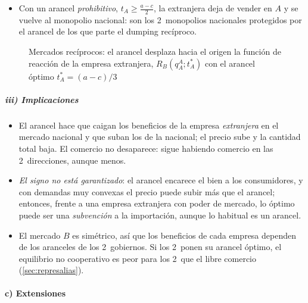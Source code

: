 \documentclass[11pt]{article}
\begin{document}
\begin{itemize}
  \begin{equation}\label{eq:arancel-estrategico}
  t_A^*=\frac{a-c}{3}>0.
  \end{equation}
  La empresa extranjera sigue vendiendo, $q_B^A=\frac{a-c}{9b}$, pero mucho menos; la nacional vende $\frac{4(a-c)}{9b}$, y el bienestar del país en su mercado sube en $\frac{(a-c)^2}{18b}$ respecto del libre comercio.
\item Con un arancel \emph{prohibitivo}, $t_A\geq\frac{a-c}{2}$, la extranjera deja de vender en $A$ y se vuelve al monopolio nacional: son los 2~monopolios nacionales protegidos por el arancel de los que parte el dumping recíproco.
\end{itemize}

\begin{figure}[H]
\centering
\caption{Mercados recíprocos: el arancel desplaza hacia el origen la función de reacción de la empresa extranjera, $R_B(q_A^A;t_A^*)$ con el arancel óptimo $t_A^*=(a-c)/3$}\label{fig:arancel-reciproco}
\end{figure}

\subparagraph{iii) Implicaciones}

\begin{itemize}
\item El arancel hace que caigan los beneficios de la empresa \emph{extranjera} en el mercado nacional y que suban los de la nacional; el precio sube y la cantidad total baja. El comercio no desaparece: sigue habiendo comercio en las 2~direcciones, aunque menos.
\item \emph{El signo no está garantizado}: el arancel encarece el bien a los consumidores, y con demandas muy convexas el precio puede subir más que el arancel; entonces, frente a una empresa extranjera con poder de mercado, lo óptimo puede ser una \emph{subvención} a la importación, aunque lo habitual es un arancel\nocite{Brander1995Strategic}.
\item El mercado $B$ es simétrico, así que los beneficios de cada empresa dependen de los aranceles de los 2~gobiernos. Si los 2~ponen su arancel óptimo, el equilibrio no cooperativo es peor para los 2~que el libre comercio (\ref{sec:represalias}).
\end{itemize}

\paragraph{c) Extensiones}
\end{document}
